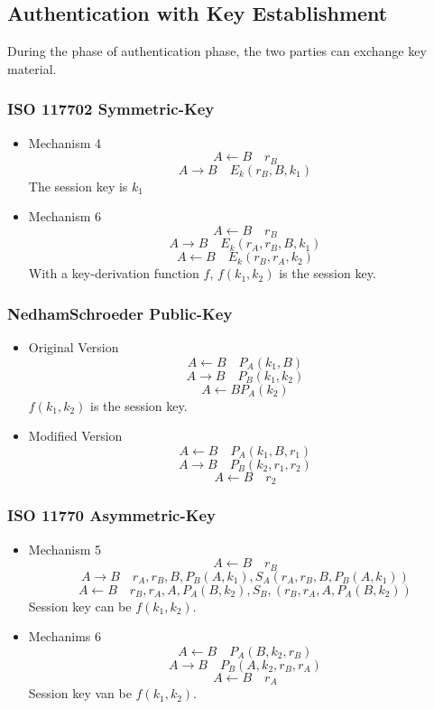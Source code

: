 \subsection{Authentication with Key Establishment}
During the phase of authentication phase, the two parties can exchange key
material.

\subsubsection{ISO 11770\text{-}2 Symmetric-Key}
\begin{itemize}
    \item Mechanism 4
    $$ A \leftarrow B \quad r_B $$
    $$ A \rightarrow B \quad E_k(r_B,B,k_1) $$
    The session key is $k_1$

    \item Mechanism 6
    $$ A \leftarrow B \quad r_B $$
    $$ A \rightarrow B \quad E_k(r_A,r_B,B,k_1) $$
    $$ A \leftarrow B \quad E_k(r_B,r_A,k_2) $$
    With a key-derivation function $f$, $f(k_1,k_2)$ is the session key.
\end{itemize}

\subsubsection{Nedham\text{-}Schroeder Public-Key}
\begin{itemize}
    \item Original Version
    $$ A \leftarrow B \quad P_A(k_1,B)  $$
    $$ A \rightarrow B \quad P_B(k_1,k_2) $$
    $$ A \leftarrow B P_A(k_2) $$
    $f(k_1,k_2)$ is the session key.
    \item Modified Version
    $$ A \leftarrow B \quad P_A(k_1,B,r_1) $$
    $$ A \rightarrow B \quad P_B(k_2,r_1,r_2) $$
    $$ A \leftarrow B \quad r_2 $$
\end{itemize}

\subsubsection{ISO 11770\text{-} Asymmetric-Key}
\begin{itemize}
    \item Mechanism 5
    $$ A \leftarrow B \quad r_B $$
    $$ A \rightarrow B \quad r_A,r_B,B,P_B(A,k_1),S_A(r_A,r_B,B,P_B(A,k_1))$$
    $$ A \leftarrow B \quad r_B,r_A,A,P_A(B,k_2),S_B,(r_B,r_A,A,P_A(B,k_2))$$
    Session key can be $f(k_1,k_2)$.
    \item Mechanims 6
    $$ A \leftarrow B \quad P_A(B,k_2,r_B) $$
    $$ A \rightarrow B \quad P_B(A,k_2,r_B,r_A) $$
    $$ A \leftarrow B \quad r_A $$
    Session key van be $f(k_1,k_2)$.
\end{itemize}
